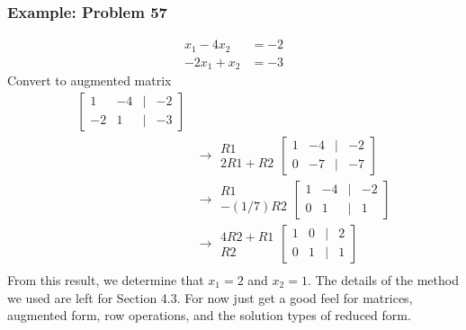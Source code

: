 \documentclass[14pt]{extarticle}
\begin{document}
\subsubsection*{Example: Problem 57}
\begin{align*}
	x_1 - 4x_2 &= -2 \\
	-2x_1 + x_2 &= -3
\end{align*}
Convert to augmented matrix
\begin{align*}
	\begin{bmatrix}
		1 & -4 & | & -2\\
		-2 & 1 & | & -3
	\end{bmatrix} \\
	&\to 
	\begin{array}{r}
		R1 \\
		2R1+R2
	\end{array}
	\begin{bmatrix}
		1 & -4 & | & -2\\
		0 & -7 & | & -7
	\end{bmatrix} \\
	&\to 
	\begin{array}{r}
		R1 \\
		-(1/7)R2
	\end{array}
	\begin{bmatrix}
		1 & -4 & | & -2\\
		0 & 1 & | & 1
	\end{bmatrix} \\
	&\to 
	\begin{array}{r}
		4R2 + R1 \\
		R2
	\end{array}
	\begin{bmatrix}
		1 & 0 & | & 2\\
		0 & 1 & | & 1
	\end{bmatrix} \\
\end{align*}
From this result, we determine that $x_1=2$ and $x_2 = 1$. The details of the method we used are left for Section 4.3. For now just get a good feel for matrices, augmented form, row operations, and the solution types of reduced form.

\cleardoublepage
\end{document}
